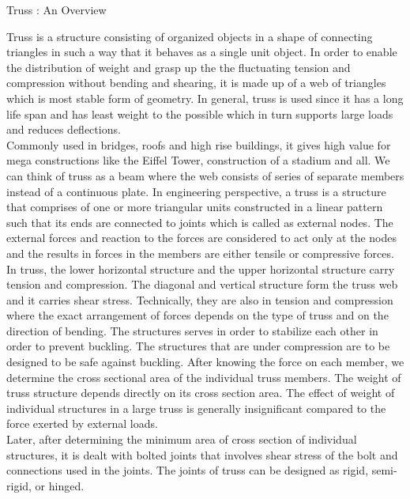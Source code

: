 \documentclass[a4paper,15pt]{article}
\begin{document}
     \begin{center}
     	Truss : An Overview
     \end{center}
    Truss is a structure consisting of organized objects in a shape of connecting triangles in such a way that it behaves as a single unit object. In order to enable the distribution of weight and grasp up the the fluctuating tension and compression without bending and shearing, it is made up of a web of triangles which is most stable form of geometry. In general, truss is used since it has a long life span and has least weight to the possible which in turn supports large loads and reduces deflections.\\
    
   Commonly used in bridges, roofs and high rise buildings, it gives high value for mega constructions like the Eiffel Tower, construction of a stadium and all. We can think of truss as a beam where the web consists of series of separate members instead of a continuous plate. In engineering perspective, a truss is a structure that comprises of one or more triangular units constructed in a linear pattern such that its ends are connected to joints which is called as external nodes. The external forces and reaction to the forces are considered to act only at the nodes and the results in forces in the members are either tensile or compressive forces. In truss, the lower horizontal structure and the upper horizontal structure carry tension and compression. The diagonal and vertical structure form the truss web and it carries shear stress. Technically, they are also in tension and compression where the exact arrangement of forces depends on the type of truss and on the direction of bending. The structures serves in order to stabilize each other in order to prevent buckling. The structures that are under compression are to be designed to be safe against buckling. After knowing the force on each member, we determine the cross sectional area of the individual truss members. The weight of truss structure depends directly on its cross section area. The effect of weight of individual structures in a large truss is generally insignificant compared to the force exerted by external loads.\\
   
   Later, after determining the minimum area of cross section of individual structures, it is dealt with bolted joints that involves shear stress of the bolt and connections used in the joints. The joints of truss can be designed as rigid, semi-rigid, or hinged.\\
   
\end{document}
